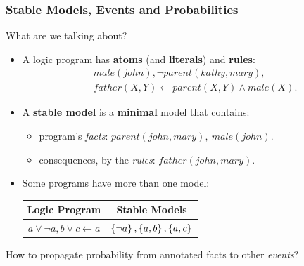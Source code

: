 \documentclass[bigger]{beamer}
\begin{document}
%
\begin{frame}
    \frametitle{Stable Models, Events and Probabilities}
    \vfill
    \begin{center}
        What are we talking about?
    \end{center}
    \vfill
    \begin{itemize}
        \item A logic program has \textbf{atoms} (and \textbf{literals}) and \textbf{rules}:
            $$
            \begin{aligned}
                &male(john), \neg parent(kathy,mary), \\
                &father(X, Y) \leftarrow parent(X, Y) \wedge male(X).
            \end{aligned}
            $$
        \item A \alert{\textbf{stable model}} is a \textbf{minimal} model that contains:
              \begin{itemize}
                  \item program's \emph{facts}: $parent(john,mary),~male(john)$.
                  \item consequences, by the \emph{rules}: $father(john,mary)$.
              \end{itemize}
        \item Some programs have more than one model:
              \begin{tabular}{c|c}
                  \textbf{Logic Program} & \textbf{Stable Models} \\
                  \hline
                  $a \vee \neg a,  b \vee c \leftarrow a$
                                         &
                  $\set{\neg a}, \set{a, b}, \set{a, c}$
              \end{tabular}
    \end{itemize}
    \vfill
    \begin{center}
        How to propagate probability from annotated facts to other \emph{events}?
    \end{center}
\end{frame}
%
\end{document}
